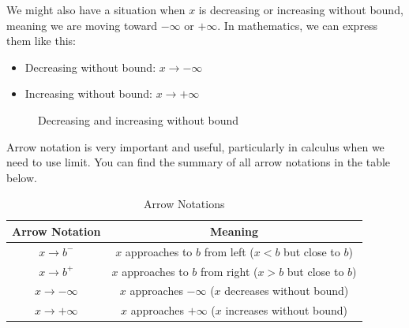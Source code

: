 We might also have a situation when $x$ is decreasing or increasing without bound, meaning we are moving toward $-\infty$ or $+\infty$. In mathematics, we can express them like this:
\begin{itemize}
    \item Decreasing without bound: $x \rightarrow -\infty$
    \item Increasing without bound: $x \rightarrow +\infty$
\end{itemize}
%
\begin{figure}[ht]
  \centering
  \caption{Decreasing and increasing without bound}
\end{figure}
%
Arrow notation is very important and useful, particularly in calculus when we need to use limit. You can find the summary of all arrow notations in the table below.
\begin{table}[ht]
  \centering
  \caption{Arrow Notations}
  \begin{tabular}{c|c}
    \toprule
    Arrow Notation & Meaning \\
    \hline \hline
    $x \rightarrow b^-$ & $x$ approaches to $b$ from left ($x<b$ but close to $b$) \\
    $x \rightarrow b^+$ & $x$ approaches to $b$ from right ($x>b$ but close to $b$) \\
    $x \rightarrow -\infty$ & $x$ approaches $-\infty$ ($x$ decreases without bound) \\    
    $x \rightarrow +\infty$ & $x$ approaches $+\infty$ ($x$ increases without bound) \\
    \bottomrule
  \end{tabular}
   \label{tab:arrow_notation}
\end{table}
